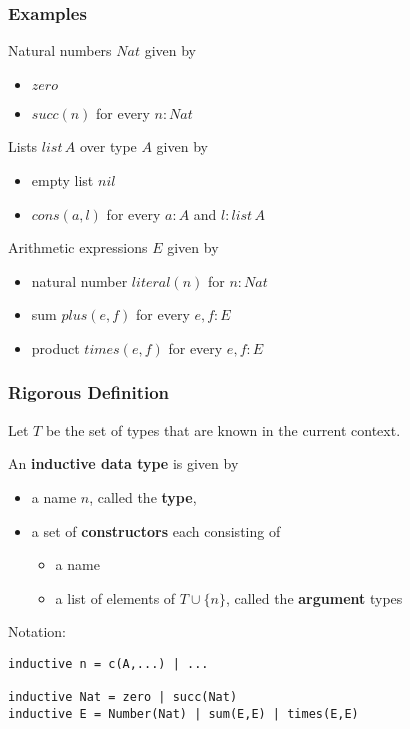 \begin{frame}\frametitle{Examples}
Natural numbers $Nat$ given by
\begin{itemize}
\item $zero$
\item $succ(n)$ for every $n:Nat$
\end{itemize}

Lists $list\,A$ over type $A$ given by
\begin{itemize}
\item empty list $nil$
\item $cons(a,l)$ for every $a:A$ and $l:list\,A$
\end{itemize}

Arithmetic expressions $E$ given by
\begin{itemize}
\item natural number $literal(n)$ for $n:Nat$
\item sum $plus(e,f)$ for every $e,f:E$
\item product $times(e,f)$ for every $e,f:E$
\end{itemize}
\end{frame}

\begin{frame}[fragile]\frametitle{Rigorous Definition}
Let $T$ be the set of types that are known in the current context.

An \textbf{inductive data type} is given by
\begin{itemize}
 \item a name $n$, called the \textbf{type},
 \item a set of \textbf{constructors} each consisting of
 \begin{itemize}
  \item a name
  \item a list of elements of $T\cup\{n\}$, called the \textbf{argument} types
 \end{itemize} 
\end{itemize}

Notation:
\begin{lstlisting}
inductive n = c(A,...) | ...

inductive Nat = zero | succ(Nat)
inductive E = Number(Nat) | sum(E,E) | times(E,E)
\end{lstlisting}
\end{frame}

